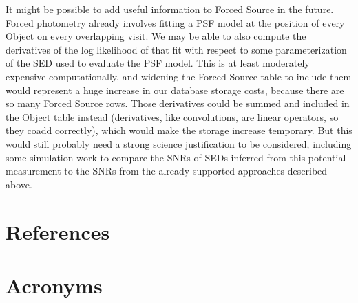\documentclass[DM,authoryear,toc]{lsstdoc}
\begin{document}
It might be possible to add useful information to Forced Source in the future.
Forced photometry already involves fitting a PSF model at the position of every Object on every overlapping visit.
We may be able to also compute the derivatives of the log likelihood of that fit with respect to some parameterization of the SED used to evaluate the PSF model.
This is at least moderately expensive computationally, and widening the Forced Source table to include them would represent a huge increase in our database storage costs, because there are so many Forced Source rows.
Those derivatives could be summed and included in the Object table instead (derivatives, like convolutions, are linear operators, so they coadd correctly), which would make the storage increase temporary.
But this would still probably need a strong science justification to be considered, including some simulation work to compare the SNRs of SEDs inferred from this potential measurement to the SNRs from the already-supported approaches described above.

\appendix
\section{References} \label{sec:bib}
\renewcommand{\refname}{} %


\section{Acronyms} \label{sec:acronyms}

\end{document}
